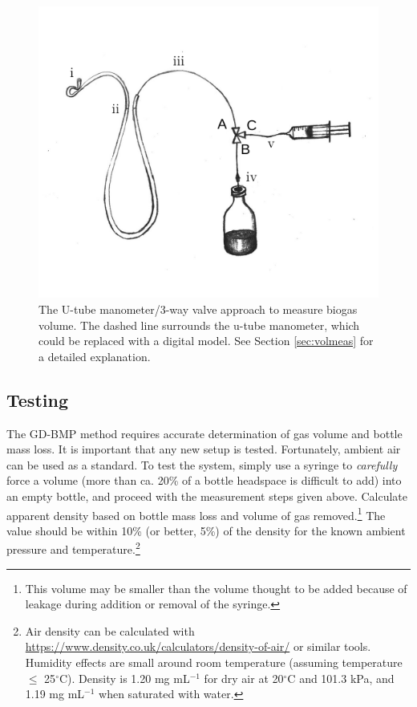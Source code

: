 \documentclass[]{article}
\begin{document}
\begin{figure}
  \includegraphics[]{figs/GD_utube.pdf}
  \caption{The U-tube manometer/3-way valve approach to measure biogas volume. The dashed line surrounds the u-tube manometer, which could be replaced with a digital model. See Section \ref{sec:volmeas} for a detailed explanation.} 
  \label{fig:utube}
\end{figure}

\subsection{Testing}
The GD-BMP method requires accurate determination of gas volume and bottle mass loss.
It is important that any new setup is tested.
Fortunately, ambient air can be used as a standard.
To test the system, simply use a syringe to \textit{carefully} force a volume (more than ca. 20\% of a bottle headspace is difficult to add) into an empty bottle, and proceed with the measurement steps given above. 
Calculate apparent density based on bottle mass loss and volume of gas removed.\footnote{This volume may be smaller than the volume thought to be added because of leakage during addition or removal of the syringe.}
The value should be within 10\% (or better, 5\%) of the density for the known ambient pressure and temperature.\footnote{Air density can be calculated with \url{https://www.density.co.uk/calculators/density-of-air/} or similar tools. Humidity effects are small around room temperature (assuming temperature $\le$ 25$^\circ$C). Density is 1.20 mg mL$^{-1}$ for dry air at 20$^\circ$C and 101.3 kPa, and 1.19 mg mL$^{-1}$ when saturated with water.}
\end{document}
